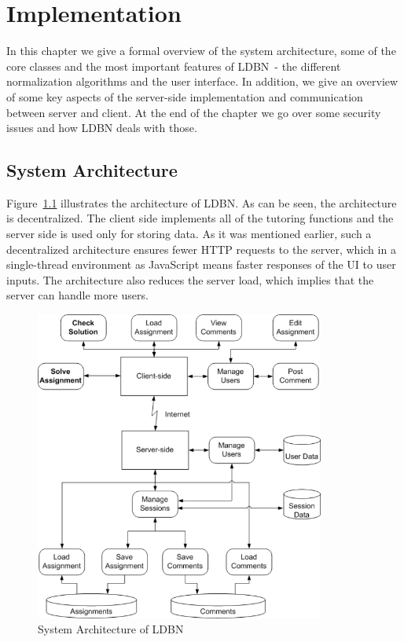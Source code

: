 \chapter{Implementation}
\label{chap:impl}
In this chapter we give a formal overview of the system architecture,
some of the core classes and the most important
features of LDBN~- the different normalization algorithms and the user interface. 
In addition, we give an overview
of some key aspects of the server-side implementation and communication
between server and client. At the end of the chapter we go over some
security issues and how LDBN deals with those. 

\section{System Architecture}
Figure~\ref{fig:sysarch} illustrates the architecture of LDBN. 
As can be seen, the architecture is decentralized. The client side implements 
all of the tutoring functions and the server side is used only for storing data.
As it was mentioned earlier, such a decentralized architecture ensures fewer HTTP requests to
the server, which in a single-thread environment as JavaScript means faster 
responses of the UI to user inputs. The architecture also reduces the server load,
which implies that the server can handle more users.

\begin{figure}[h]
	\begin{center}
		\includegraphics[width=0.85\textwidth]{./img/architecture01a.png}
		\caption{System Architecture of LDBN}
		\label{fig:sysarch}
	\end{center}
\end{figure}

